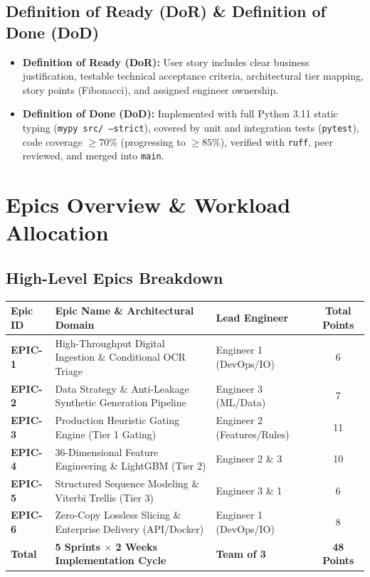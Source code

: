 \documentclass[11pt,a4paper]{article}
\begin{document}
\subsection{Definition of Ready (DoR) \& Definition of Done (DoD)}
\begin{itemize}[leftmargin=1.5em, itemsep=3pt]
    \item \textbf{Definition of Ready (DoR):} User story includes clear business justification, testable technical acceptance criteria, architectural tier mapping, story points (Fibonacci), and assigned engineer ownership.
    \item \textbf{Definition of Done (DoD):} Implemented with full Python 3.11 static typing (\texttt{mypy src/ --strict}), covered by unit and integration tests (\texttt{pytest}), code coverage $\ge 70\%$ (progressing to $\ge 85\%$), verified with \texttt{ruff}, peer reviewed, and merged into \texttt{main}.
\end{itemize}

\clearpage

\section{Epics Overview \& Workload Allocation}

\subsection{High-Level Epics Breakdown}

\vspace{0.4em}
\noindent
\small
\renewcommand{\arraystretch}{1.3}
\begin{tabularx}{\textwidth}{lXlc}
\toprule
\textbf{Epic ID} & \textbf{Epic Name \& Architectural Domain} & \textbf{Lead Engineer} & \textbf{Total Points} \\
\midrule
\textbf{EPIC-1} & High-Throughput Digital Ingestion \& Conditional OCR Triage & Engineer 1 (DevOps/IO) & 6 \\
\textbf{EPIC-2} & Data Strategy \& Anti-Leakage Synthetic Generation Pipeline & Engineer 3 (ML/Data) & 7 \\
\textbf{EPIC-3} & Production Heuristic Gating Engine (Tier 1 Gating) & Engineer 2 (Features/Rules) & 11 \\
\textbf{EPIC-4} & 36-Dimensional Feature Engineering \& LightGBM (Tier 2) & Engineer 2 \& 3 & 10 \\
\textbf{EPIC-5} & Structured Sequence Modeling \& Viterbi Trellis (Tier 3) & Engineer 3 \& 1 & 6 \\
\textbf{EPIC-6} & Zero-Copy Lossless Slicing \& Enterprise Delivery (API/Docker) & Engineer 1 (DevOps/IO) & 8 \\
\midrule
\textbf{Total} & \textbf{5 Sprints $\times$ 2 Weeks Implementation Cycle} & \textbf{Team of 3} & \textbf{48 Points} \\
\bottomrule
\end{tabularx}
\end{document}

